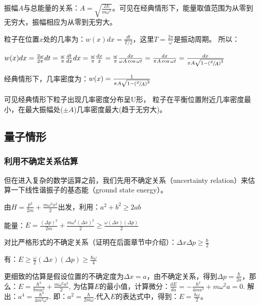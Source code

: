 振幅$A$与总能量的关系：$A = \sqrt {\frac{{2E}}{{m\omega ^2 }}} $。可见在经典情形下，能量取值范围为从零到无穷大，振幅相应为从零到无穷大。

粒子在位置$x$处的几率为：$w(x)dx = \frac{{dt}}{{T/2}}$，这里$T = \frac{{2\pi }}{\omega }$是振动周期。
所以：

$w(x)dx = \frac{{2\omega }}{{2\pi }}dt = \frac{\omega }{\pi }\frac{{dt}}{{dx}}dx = \frac{\omega }{\pi }\frac{{dx}}{{\dot x}} = \frac{\omega }{\pi }\frac{{dx}}{{\omega A\cos \omega t}} = \frac{{dx}}{{\pi A\cos \omega t}} = \frac{{dx}}{{\pi A\sqrt {1 - \left( {{\raise0.5ex\hbox{$\scriptstyle x$}
\kern-0.1em/\kern-0.15em
\lower0.25ex\hbox{$\scriptstyle A$}}} \right)^2 } }}$

经典情形下，几率密度为：$w(x) = \frac{1}{{\pi A\sqrt {1 - \left( {{\raise0.5ex\hbox{$\scriptstyle x$}
\kern-0.1em/\kern-0.15em
\lower0.25ex\hbox{$\scriptstyle A$}}} \right)^2 } }}$

可见经典情形下粒子出现几率密度分布呈U形，
粒子在平衡位置附近几率密度最小，在最大振幅处($ \pm A$)几率密度最大(趋于无穷大)。


\subsection{量子情形}

\subsubsection{利用不确定关系估算}


但在进入复杂的数学运算之前，我们先用不确定关系（uncertainty
relation）来估算一下线性谐振子的基态能（ground state energy）。

由$H = \frac{p^2}{2m} + \frac{m \omega^2 x^2}{2}$出发，利用：$a^2
+b^2 \ge 2ab$

能量：$E = \frac{(\Delta p)^2}{2m} + \frac{m \omega^2 (\Delta
x)^2}{2} \ge \frac{\omega (\Delta x) (\Delta p)}{2}$

对比严格形式的不确定关系（证明在后面章节中介绍）：$\Delta x \Delta p
\ge \frac{\hbar}{2}$

有：$E \ge \frac{\omega}{2} (\Delta x) (\Delta p) \ge \frac{\hbar
\omega}{4}$

更细致的估算是假设位置的不确定度为$\Delta x
=a$，由不确定关系，得到$\Delta p = \frac{\hbar}{2a}$，那么：$ E =
\frac{\hbar^2}{8ma^2} + \frac{m \omega^2 a^2}{2}$,
为估算$E$的最小值，计算微分：$\frac{d E}{d a} = -
\frac{\hbar^2}{4ma^3} +m \omega^2 a =0$. 解出：$a^4 =
\frac{\hbar^2}{4m^2 \omega^2}$. 即：$a^2 = \frac{\hbar}{2 m
\omega}$.代入$E$的表达式中，得到：$E = \frac{\hbar \omega}{2}$。


